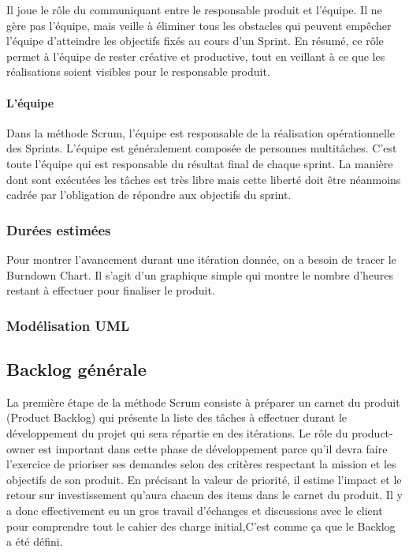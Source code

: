 Il joue le rôle du communiquant entre le responsable produit et
l’équipe. Il ne gère pas l’équipe, mais veille à éliminer tous les obstacles qui peuvent
empêcher l’équipe d’atteindre les objectifs fixés au cours d’un Sprint. En résumé, ce rôle
permet à l’équipe de rester créative et productive, tout en veillant à ce que les
réalisations soient visibles pour le responsable produit.

\paragraph{L'équipe}

Dans la méthode Scrum, l’équipe est responsable de la réalisation
opérationnelle des Sprints. L’équipe est généralement composée de personnes
multitâches. C’est toute l’équipe qui est responsable du résultat final de chaque sprint.
La manière dont sont exécutées les tâches est très libre mais cette liberté doit être
néanmoins cadrée par l’obligation de répondre aux objectifs du sprint.

\subsubsection{Durées estimées}

Pour montrer l’avancement durant une itération donnée, on a besoin de tracer le
Burndown Chart. Il s’agit d’un graphique simple qui montre le nombre d’heures restant
à effectuer pour finaliser le produit. 

\subsubsection{Modélisation UML}

\subsection{Backlog générale}

La première étape de la méthode Scrum consiste à préparer un carnet du produit
(Product Backlog) qui présente la liste des tâches à effectuer durant le développement
du projet qui sera répartie en des itérations. Le rôle du product-owner est important
dans cette phase de développement parce qu’il devra faire l’exercice de prioriser ses
demandes selon des critères respectant la mission et les objectifs de son produit. En
précisant la valeur de priorité, il estime l’impact et le retour sur investissement 
qu’aura chacun des items dans le carnet du produit.
Il y a donc effectivement eu un gros travail
d’échanges et discussions avec le client pour comprendre tout le cahier des charge
initial,C’est comme ça que le Backlog a été défini.

